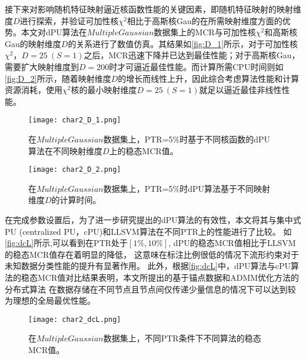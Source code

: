 接下来对影响随机特征映射逼近核函数性能的关键因素，即随机特征映射的映射维度$D$进行探索，并验证可加性核$\chi^2$相比于高斯核Gau的在所需映射维度方面的优势。本文对dPU算法在$MultipleGaussian$数据集上的MCR与可加性核$\chi^2$和高斯核Gau的映射维度$D$的关系进行了数值仿真。其结果如\autoref{fig:D_1}所示，对于可加性核$\chi^2$，$D=25~(S=1)$之后，MCR迅速下降并已达到最佳性能；对于高斯核Gau，需要扩大映射维度到$D=200$时才可逼近最佳性能。而计算所需CPU时间则如\autoref{fig:D_2}所示，随着映射维度$D$的增长而线性上升，因此综合考虑算法性能和计算资源消耗，使用$\chi^2$核的最小映射维度$D=25~(S=1)$就足以逼近最佳非线性性能。
\begin{figure}
    \centering
    \texttt{[image: char2\_D\_1.png]}
    \caption{\label{fig:D_1}在$MultipleGaussian$数据集上，PTR=5\%时基于不同核函数的dPU算法在不同映射维度$D$上的稳态MCR值。}
\end{figure}
\begin{figure}
    \centering
    \texttt{[image: char2\_D\_2.png]}
    \caption{\label{fig:D_2}在$MultipleGaussian$数据集上，PTR=5\%时dPU算法基于不同映射维度$D$的计算时间。}
\end{figure}

在完成参数设置后，为了进一步研究提出的dPU算法的有效性，本文将其与集中式PU (centralized PU，cPU)和LLSVM算法在不同PTR上的性能进行了比较。
如\autoref{fig:dcL}所示,可以看到在PTR处于$\left[1\%,10\%\right]$, dPU的稳态MCR值相比于LLSVM的稳态MCR值存在着明显的降低，
这意味在标注比例很低的情况下流形约束对于未知数据分类性能的提升有显著作用。
此外，根据\autoref{fig:dcL}中，dPU算法与cPU算法的稳态MCR值对比结果表明，本文所提出的基于锚点数据和ADMM优化方法的分布式算法
在数据存储在不同节点且节点间仅传递少量信息的情况下可以达到较为理想的全局最优性能。
\begin{figure}
    \centering
    \texttt{[image: char2\_dcL.png]}
    \caption{\label{fig:dcL}在$MultipleGaussian$数据集上，不同PTR条件下不同算法的稳态MCR值。}
\end{figure}

